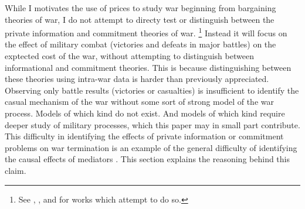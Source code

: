 While I motivates the use of prices to study war beginning from bargaining theories of war, I do not attempt to directy test or distinguish between the private information and commitment theories of war.%
\footnote{See \textcite{Ramsay2008}, \textcite{Weisiger2015}, and \textcite{Reiter2009} for works which attempt to do so.}
Instead it will focus on the effect of military combat (victories and defeats in major battles) on the exptected cost of the war, without attempting to distinguish between informational and commitment theories.
This is because distinguishing between these theories using intra-war data is harder than previously appreciated.
Observing only battle results (victories or casualties) is insufficient to identify the casual mechanism of the war without some sort of strong model of the war process.
Models of which kind do not exist.
And models of which kind require deeper study of military processes, which this paper may in small part contribute.
This difficulty in identifying the effects of private information or commitment problems on war termination is an example of the general difficulty of identifying the causal effects of mediators \parencite{Keele2015a}.
This section explains the reasoning behind this claim.

